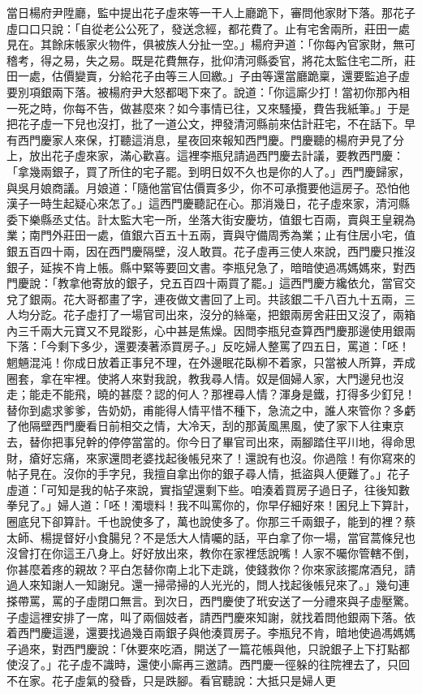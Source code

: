 當日楊府尹陞廳，監中提出花子虛來等一干人上廳跪下，審問他家財下落。那花子虛口口只說：「自從老公公死了，發送念經，都花費了。止有宅舍兩所，莊田一處見在。其餘床帳家火物件，俱被族人分扯一空。」楊府尹道：「你每內官家財，無可稽考，得之易，失之易。既是花費無存，批仰清河縣委官，將花太監住宅二所，莊田一處，估價變賣，分給花子由等三人回繳。」子由等還當廳跪稟，還要監追子虛要別項銀兩下落。被楊府尹大怒都喝下來了。說道：「你這廝少打！當初你那內相一死之時，你每不告，做甚麼來？如今事情已往，又來騷擾，費告我紙筆。」于是把花子虛一下兒也沒打，批了一道公文，押發清河縣前來估計莊宅，不在話下。早有西門慶家人來保，打聽這消息，星夜回來報知西門慶。門慶聽的楊府尹見了分上，放出花子虛來家，滿心歡喜。這裡李瓶兒請過西門慶去計議，要教西門慶：「拿幾兩銀子，買了所住的宅子罷。到明日奴不久也是你的人了。」西門慶歸家，與吳月娘商議。月娘道：「隨他當官估價賣多少，你不可承攬要他這房子。恐怕他漢子一時生起疑心來怎了。」這西門慶聽記在心。那消幾日，花子虛來家，清河縣委下樂縣丞丈估。計太監大宅一所，坐落大街安慶坊，值銀七百兩，賣與王皇親為業；南門外莊田一處，值銀六百五十五兩，賣與守備周秀為業；止有住居小宅，值銀五百四十兩，因在西門慶隔壁，沒人敢買。花子虛再三使人來說，西門慶只推沒銀子，延挨不肯上帳。縣中緊等要回文書。李瓶兒急了，暗暗使過馮媽媽來，對西門慶說：「教拿他寄放的銀子，兌五百四十兩買了罷。」這西門慶方纔依允，當官交兌了銀兩。花大哥都畫了字，連夜做文書回了上司。共該銀二千八百九十五兩，三人均分訖。花子虛打了一場官司出來，沒分的絲毫，把銀兩房舍莊田又沒了，兩箱內三千兩大元寶又不見蹤影，心中甚是焦燥。因問李瓶兒查算西門慶那邊使用銀兩下落：「今剩下多少，還要湊著添買房子。」反吃婦人整罵了四五日，罵道：「呸！魍魎混沌！你成日放着正事兒不理，在外邊眠花臥柳不着家，只當被人所算，弄成圈套，拿在牢裡。使將人來對我說，教我尋人情。奴是個婦人家，大門邊兒也沒走；能走不能飛，曉的甚麼？認的何人？那裡尋人情？渾身是鐵，打得多少釘兒！替你到處求爹爹，告奶奶，甫能得人情平惜不種下，急流之中，誰人來管你？多虧了他隔壁西門慶看日前相交之情，大冷天，刮的那黃風黑風，使了家下人往東京去，替你把事兒幹的停停當當的。你今日了畢官司出來，兩腳踏住平川地，得命思財，瘡好忘痛，來家還問老婆找起後帳兒來了！還說有也沒。你過陰！有你寫來的帖子見在。沒你的手字兒，我擅自拿出你的銀子尋人情，抵盜與人便難了。」花子虛道：「可知是我的帖子來說，實指望還剩下些。咱湊着買房子過日子，往後知數拳兒了。」婦人道：「呸！濁壞料！我不叫罵你的，你早仔細好來！囷兒上下算計，圈底兒下卻算計。千也說使多了，萬也說使多了。你那三千兩銀子，能到的裡？蔡太師、楊提督好小食腸兒？不是恁大人情囑的話，平白拿了你一場，當官蒿條兒也沒曾打在你這王八身上。好好放出來，教你在家裡恁說嘴！人家不囑你管轄不倒，你甚麼着疼的親故？平白怎替你南上北下走跳，使錢救你？你來家該擺席酒兒，請過人來知謝人一知謝兒。還一掃帚掃的人光光的，問人找起後帳兒來了。」幾句連搽帶罵，罵的子虛閉口無言。到次日，西門慶使了玳安送了一分禮來與子虛壓驚。子虛這裡安排了一席，叫了兩個妓者，請西門慶來知謝，就找着問他銀兩下落。依着西門慶這邊，還要找過幾百兩銀子與他湊買房子。李瓶兒不肯，暗地使過馮媽媽子過來，對西門慶說：「休要來吃酒，開送了一篇花帳與他，只說銀子上下打點都使沒了。」花子虛不識時，還使小廝再三邀請。西門慶一徑躲的往院裡去了，只回不在家。花子虛氣的發昏，只是跌腳。看官聽說：大抵只是婦人更